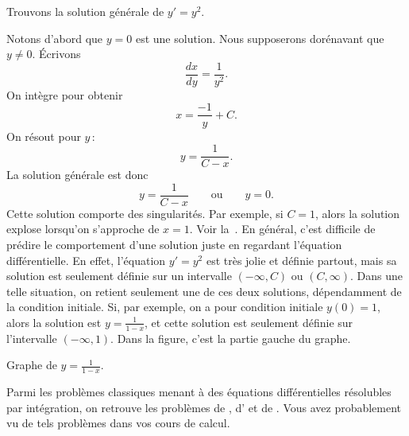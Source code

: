 \begin{example}
Trouvons la solution générale de
$y' = y^2$.

Notons d'abord que $y=0$ est une solution.  Nous supposerons dorénavant que $y \not= 0$.
Écrivons 
\begin{equation*}
	\frac{dx}{dy} = \frac{1}{y^2} .
\end{equation*}
On intègre pour obtenir 
\begin{equation*}
	x = \frac{-1}{y} + C .
\end{equation*}
On résout pour $y$\,:
\begin{equation*}
	y = \frac{1}{C-x}.
\end{equation*}
La solution générale est donc 
\begin{equation*}
	y = \frac{1}{C-x} \qquad \text{ou} \qquad y = 0.
\end{equation*}
Cette solution comporte des singularités. Par exemple, si $C=1$, alors la solution \og{}explose\fg{} lorsqu'on s'approche de $x=1$.
Voir la~.  En général, c'est difficile de prédire le comportement d'une solution juste en regardant l'équation différentielle.  En effet, l'équation $y' = y^2$ est très jolie et définie partout, mais sa solution est seulement définie sur un intervalle $(-\infty, C)$ ou
$(C, \infty)$.  Dans une telle situation, on retient seulement une de ces deux solutions, dépendamment de la condition initiale.  Si,  par exemple, on a pour condition initiale $y(0) = 1$, alors la solution est $y=\frac{1}{1-x}$, et cette solution est seulement définie sur l'intervalle  $(-\infty,1)$. Dans la figure, c'est la partie gauche du graphe.

\begin{myfig}
\capstart
{}
\caption{Graphe de $y=\frac{1}{1-x}$.\label{1over1mx:fig}}
\end{myfig}
\end{example}

Parmi les problèmes classiques menant à des équations différentielles résolubles par intégration, on retrouve les problèmes de ,
d' et de  .  Vous avez probablement vu de tels problèmes dans vos cours de calcul.

